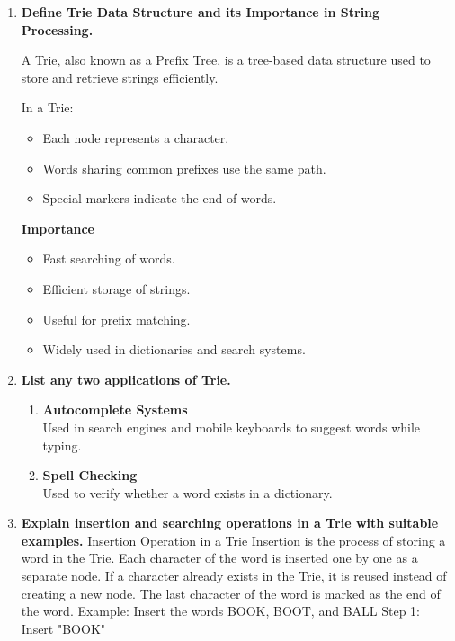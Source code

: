 
\begin{enumerate}[label=\textbf{\Alph*.}]

\item \textbf{Define Trie Data Structure and its Importance in String Processing.}

A Trie, also known as a Prefix Tree, is a tree-based data structure used to store
and retrieve strings efficiently.

In a Trie:
\begin{itemize}
\item Each node represents a character.
\item Words sharing common prefixes use the same path.
\item Special markers indicate the end of words.
\end{itemize}

\textbf{Importance}
\begin{itemize}
\item Fast searching of words.
\item Efficient storage of strings.
\item Useful for prefix matching.
\item Widely used in dictionaries and search systems.
\end{itemize}

\item \textbf{List any two applications of Trie.}

\begin{enumerate}[label=\textbf{\arabic*.}]
\item \textbf{Autocomplete Systems}\\
Used in search engines and mobile keyboards to suggest words while typing.

\item \textbf{Spell Checking}\\
Used to verify whether a word exists in a dictionary.
\end{enumerate}

\item \textbf{Explain insertion and searching operations in a Trie with suitable examples.}
Insertion Operation in a Trie
Insertion is the process of storing a word in the Trie. Each character of the word is inserted one by one as a separate node. If a character already exists in the Trie, it is reused instead of creating a new node. The last character of the word is marked as the end of the word.
Example: Insert the words BOOK, BOOT, and BALL
Step 1: Insert "BOOK"


\end{enumerate}
